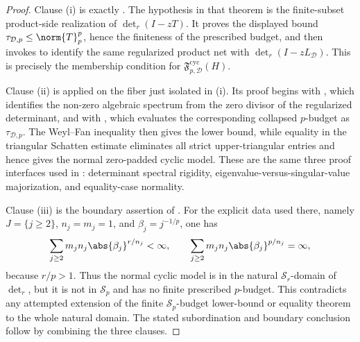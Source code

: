 \begin{proof}
  Clause \textup{(i)} is exactly
  .  The hypothesis in
  that theorem is the finite-subset product-side realization of
  \(\det_r(I-zT)\).  It proves the displayed bound
  \(\tau_{\mathcal D,p}\le\norm{T}_p^p\), hence the finiteness of the
  prescribed budget, and then invokes
  to identify the same regularized product net with
  \(\det_r(I-zL_{\mathcal D})\).  This is
  precisely the membership condition for
  \(\mathfrak F_{p,\mathcal D}^{\mathrm{cyc}}(H)\).

  Clause \textup{(ii)} is
   applied on the fiber just
  isolated in \textup{(i)}.  Its proof begins with
  , which identifies the
  non-zero algebraic spectrum from the zero divisor of the regularized
  determinant, and with , which
  evaluates the corresponding collapsed \(p\)-budget as
  \(\tau_{\mathcal D,p}\).  The Weyl--Fan inequality then gives the lower
  bound, while equality in the triangular Schatten estimate eliminates all
  strict upper-triangular entries and hence gives the normal zero-padded cyclic
  model.  These are the same three proof interfaces used in
  : determinant spectral rigidity,
  eigenvalue-versus-singular-value majorization, and equality-case normality.

  Clause \textup{(iii)} is the boundary assertion of
  .  For the explicit data
  used there, namely \(J=\{j\ge2\}\), \(n_j=m_j=1\), and
  \(\beta_j=j^{-1/p}\), one has
  \[
    \sum_{j\ge2}m_jn_j\abs{\beta_j}^{r/n_j}<\infty,
    \qquad
    \sum_{j\ge2}m_jn_j\abs{\beta_j}^{p/n_j}=\infty,
  \]
  because \(r/p>1\).  Thus the normal cyclic model is in the natural
  \(\mathcal S_r\)-domain of \(\det_r\), but it is not in \(\mathcal S_p\) and
  has no finite prescribed \(p\)-budget.  This contradicts any attempted
  extension of the finite \(\mathcal S_p\)-budget lower-bound or equality
  theorem to the whole natural domain.  The stated subordination and boundary
  conclusion follow by combining the three clauses.
\end{proof}

